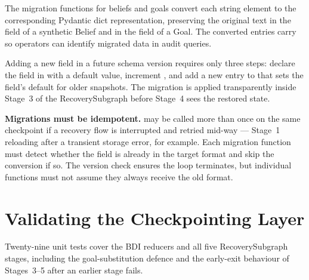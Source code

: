 \medskip
The migration functions for beliefs and goals convert each string element
to the corresponding Pydantic dict representation, preserving the original
text in the  field of a synthetic Belief and in the
 field of a Goal.  The converted entries carry
 so operators can identify
migrated data in audit queries.

Adding a new field in a future schema version requires only three steps:
declare the field in  with a default value, increment
, and add a new entry to
 that sets the field's default for older snapshots.
The migration is applied transparently inside Stage~3 of the
RecoverySubgraph before Stage~4 sees the restored state.

\begin{tipbox}
\textbf{Migrations must be idempotent.}   may be
called more than once on the same checkpoint if a recovery flow is
interrupted and retried mid-way --- Stage~1 reloading after a transient
storage error, for example.  Each migration function must detect whether
the field is already in the target format and skip the conversion if so.
The version check  ensures
the loop terminates, but individual functions must not assume they always
receive the old format.
\end{tipbox}

\section{Validating the Checkpointing Layer}
\label{sec:ch3-tests}

Twenty-nine unit tests cover the BDI reducers and all five RecoverySubgraph
stages, including the goal-substitution defence and the early-exit
behaviour of Stages~3--5 after an earlier stage fails.

